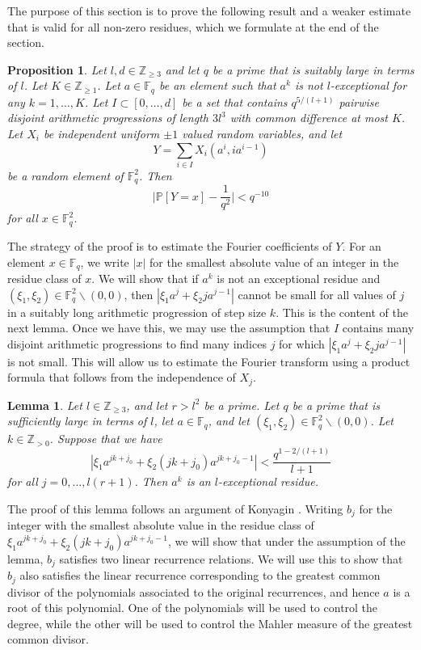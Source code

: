 \documentclass[12pt, notitlepage]{amsart}
\numberwithin{equation}{section}
\def\Z{\mathbb Z}
\def\P{\mathbb P}
\def\F{\mathbb F}
\newtheorem{lemma}[theorem]{Lemma}
\newtheorem{proposition}[theorem]{Proposition}
\theoremstyle{remark}
\theoremstyle{definition}
\theoremstyle{remark}
\numberwithin{equation}{section}
\begin{document}
The purpose of this section is to prove the following result and a weaker
estimate that is valid for all non-zero residues, which we formulate at the
end of the section.

\begin{proposition}\label{pr:unexceptional}
Let $l,d\in\Z_{\ge 3}$ and let $q$ be a prime that is suitably large in
terms of $l$.
Let $K\in\Z_{\ge1}$.
Let $a\in\F_q$ be an element such that $a^k$
is not $l$-exceptional for any $k=1,\ldots,K$.
Let $I\subset [0,\ldots,d]$ be a set that contains $q^{5/(l+1)}$ pairwise disjoint
arithmetic progressions of length $3l^3$ with common difference at most $K$.
Let $X_i$ be independent uniform $\pm1$ valued random variables, and
let
\[
Y=\sum_{i\in I}X_i(a^i,ia^{i-1})
\]
be a random element of $\F_q^2$.
Then
\[
\Big|\P[Y=x]-\frac{1}{q^2}\Big|< q^{-10}
\]
for all $x\in\F_q^2$.
\end{proposition}

The strategy of the proof is to estimate the Fourier coefficients
of $Y$.
For an element $x\in\F_q$, we write $|x|$ for the smallest absolute
value of an integer in the residue class of $x$.
We will show that if $a^k$ is not an exceptional residue and
$(\xi_1,\xi_2)\in\F_q^2\backslash(0,0)$, then
$|\xi_1 a^j+\xi_2 j a^{j-1}|$ cannot be small for all values of $j$
in a suitably long arithmetic progression of step size $k$.
This is the content of the next lemma.
Once we have this, we may use the assumption that $I$ contains
many disjoint arithmetic progressions to find many indices $j$ for which
$|\xi_1 a^j+\xi_2 j a^{j-1}|$ is not small.
This will allow us to estimate the Fourier transform using a product
formula that follows from the independence of $X_j$.

\begin{lemma}\label{lm:large-element}
Let $l\in\Z_{\ge 3}$, and let $r>l^2$ be a prime.
Let $q$ be a prime that is sufficiently large in terms of $l$, let $a\in\F_q$, and
let $(\xi_1,\xi_2)\in\F_q^2\backslash(0,0)$.
Let $k\in\Z_{> 0}$.
	Suppose that we have
	\[
	|\xi_1 a^{jk+j_0}+\xi_2(jk+j_0)a^{jk+j_0-1}|<\frac{q^{1-2/(l+1)}}{l+1}
	\]
	for all $j=0,\ldots, l(r+1)$.
	Then $a^k$ is an $l$-exceptional residue.
\end{lemma}

The proof of this lemma follows an argument of Konyagin \cite{Kon}.
Writing $b_j$ for the integer with the smallest absolute value
in the residue class of $\xi_1 a^{jk+j_0}+\xi_2(jk+j_0)a^{jk+j_0-1}$,
we will show that under the assumption of the lemma, $b_j$ satisfies
two linear recurrence relations.
We will use this to show that $b_j$ also satisfies the linear recurrence
corresponding to the greatest common divisor of the polynomials associated
to the original recurrences, and hence
$a$ is a root of this polynomial.
One of the polynomials will be used to control the degree, while the other will be
used to control the Mahler measure of the greatest common divisor.
\end{document}
